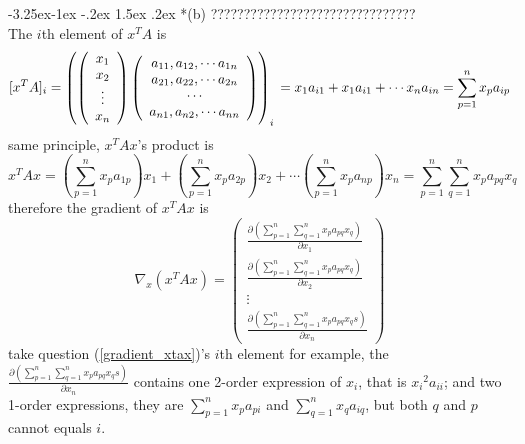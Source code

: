 \documentclass[12pt]{article}
\makeatletter
\renewcommand\subsection{\@startsection{subsection}{2}{\z@}%
	{-3.25ex\@plus -1ex \@minus -.2ex}%
	{1.5ex \@plus .2ex}%
	{\normalfont\large\bfseries}}%
\makeatother
\begin{document}
\subsection*{(b)}
{\color{red} ???????????????????????????????}\\
The $i$th element of $x^TA$ is
\begin{equation}\label{xt_a}
	[x^TA]_{i}=
	\left( 
	\left(  
	\begin{array}{c}  
		x_1 \\
		x_2 \\
		\vdots \\
		x_n 
	\end{array}
	\right)
	\left(  
	\begin{array}{c}  
		a_{11}, a_{12},\cdots a_{1n} \\
		a_{21}, a_{22},\cdots a_{2n} \\
		\cdots \\
		a_{n1}, a_{n2},\cdots a_{nn} \\
	\end{array}  
	\right)  
	\right)_{i}\\
	=x_1a_{i1} + x_1a_{i1} + \cdots x_na_{in}
	=\sum_{p=1}^n x_pa_{ip} 
\end{equation}
same principle, $x^TAx$'s product is
\begin{equation}\label{xt_a_x}
	x^TAx = (\sum_{p=1}^n x_pa_{1p})x_1 + (\sum_{p=1}^n x_pa_{2p})x_2 + \cdots (\sum_{p=1}^n x_pa_{np})x_n
	= \sum_{p=1}^n \sum_{q=1}^n x_pa_{pq}x_q
\end{equation}
therefore the gradient of $x^TAx$ is
\begin{equation}\label{gradient_xtax}
	\nabla_x(x^TAx)=
	\left(  
	\begin{array}{c}  
		\frac{\partial(\sum_{p=1}^n \sum_{q=1}^n x_pa_{pq}x_q)}{\partial x_1} \\
		\frac{\partial(\sum_{p=1}^n \sum_{q=1}^n x_pa_{pq}x_q)}{\partial x_2} \\
		\vdots \\
		\frac{\partial(\sum_{p=1}^n \sum_{q=1}^n x_pa_{pq}x_qs)}{\partial x_n} 
	\end{array}
	\right)
\end{equation}
take question (\ref{gradient_xtax})'s $i$th element for example, the $\frac{\partial(\sum_{p=1}^n \sum_{q=1}^n x_pa_{pq}x_qs)}{\partial x_n}$ contains one 2-order expression of $x_i$, that is ${x_i}^2a_{ii}$; and two 1-order expressions, they are $\sum_{p=1}^n x_pa_{pi}$ and $\sum_{q=1}^n x_qa_{iq}$, but both $q$ and $p$ cannot equals $i$.
\end{document}
